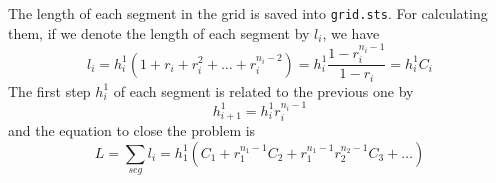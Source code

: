 The length of each segment in the grid is saved into {\tt grid.sts}. For
calculating them, if we denote the length of each segment by $l_i$, we have
\begin{equation}
l_i = h_i^1(1+r_i+r_i^2+\ldots+r_i^{n_i-2})=
h_i^1\frac{1-r_i^{n_i-1}}{1-r_i}=h_i^1C_i
\end{equation}
The first step $h_i^1$ of each segment is related to the previous one by
\begin{equation}
h_{i+1}^1 = h_i^1 r_i^{n_i-1}
\end{equation}
and the equation to close the problem is
\begin{equation}
L=\sum_{seg}l_i=h_1^1\left( C_1 + r_1^{n_1-1}C_2 +
r_1^{n_1-1}r_2^{n_2-1}C_3 + \ldots \right)
\end{equation}
